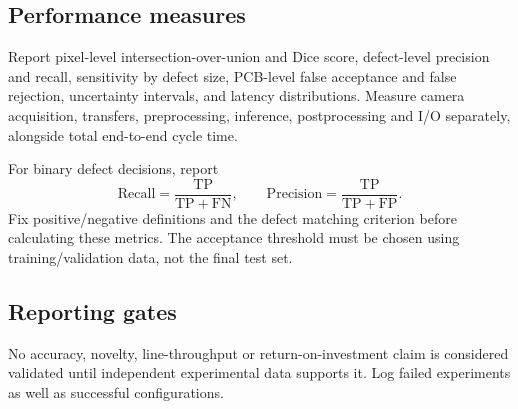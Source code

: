 \subsection{Performance measures}
Report pixel-level intersection-over-union and Dice score, defect-level precision
and recall, sensitivity by defect size, PCB-level false acceptance and false
rejection, uncertainty intervals, and latency distributions. Measure camera
acquisition, transfers, preprocessing, inference, postprocessing and I/O
separately, alongside total end-to-end cycle time.

For binary defect decisions, report
\begin{equation}
\mathrm{Recall} = \frac{\mathrm{TP}}{\mathrm{TP}+\mathrm{FN}}, \qquad
\mathrm{Precision} = \frac{\mathrm{TP}}{\mathrm{TP}+\mathrm{FP}}.
\end{equation}
Fix positive/negative definitions and the defect matching criterion before
calculating these metrics. The acceptance threshold must be chosen using
training/validation data, not the final test set.

\subsection{Reporting gates}
No accuracy, novelty, line-throughput or return-on-investment claim is considered
validated until independent experimental data supports it. Log failed
experiments as well as successful configurations.

